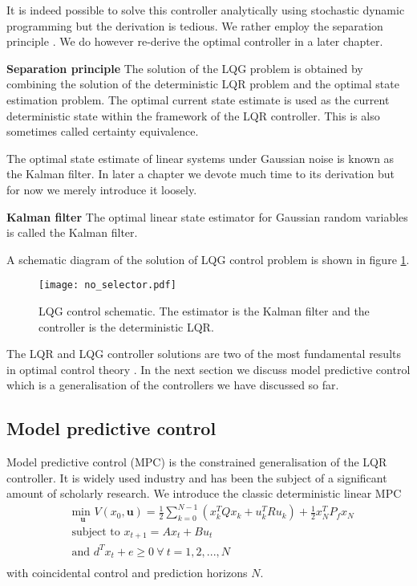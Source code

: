 It is indeed possible to solve this controller analytically using stochastic dynamic programming but the derivation is tedious. We rather employ the separation principle \cite{lqg}. We do however re-derive the optimal controller in a later chapter.
\begin{defn}
\textbf{Separation principle} The solution of the LQG problem is obtained by combining the solution of the deterministic LQR problem and the optimal state estimation problem. The optimal current state estimate is used as the current deterministic state within the framework of the LQR controller. This is also sometimes called certainty equivalence. 
\end{defn}
The optimal state estimate of linear systems under Gaussian noise is known as the Kalman filter. In later a chapter we devote much time to its derivation but for now we merely introduce it loosely.
\begin{defn}
\textbf{Kalman filter} The optimal linear state estimator for Gaussian random variables is called the Kalman filter.
\end{defn}
A schematic diagram of the solution of LQG control problem is shown  in figure \ref{fig_mpc_no_selector}.
\begin{figure}[H] 
\centering
\texttt{[image: no\_selector.pdf]}
\caption{LQG control schematic. The estimator is the Kalman filter and the controller is the deterministic LQR.}
\label{fig_mpc_no_selector}
\end{figure}
The LQR and LQG controller solutions are two of the most fundamental results in optimal control theory \cite{robust}. In the next section we discuss model predictive control which is a generalisation of the controllers we have discussed so far.
\subsection{Model predictive control}
Model predictive control (MPC) is the constrained generalisation of the LQR controller. It is widely used industry and has been the subject of a significant amount of scholarly research. We introduce the classic deterministic linear MPC  
\begin{equation}
\begin{aligned}
&\underset{\mathbf{u}}{\text{min }} V(x_0, \mathbf{u}) = \frac{1}{2}\sum_{k=0}^{N-1} \left( x_k^TQx_k + u_k^TRu_k \right) + \frac{1}{2}x_N^TP_fx_N \\
& \text{subject to } x_{t+1} = Ax_t+Bu_t \\
& \text{and } d^Tx_t + e \geq 0 ~\forall~t=1, 2,...,N \\
\end{aligned}
\label{eq_mpc_problem}
\end{equation}
with coincidental control and prediction horizons $N$.

